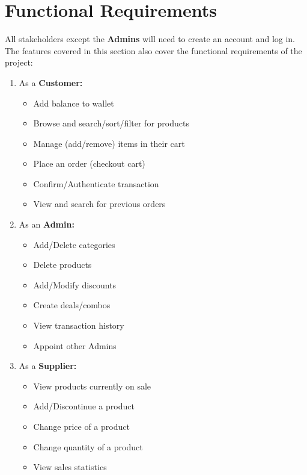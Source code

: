 \documentclass[12pt]{report}
\begin{document}
    \section*{\Huge Functional Requirements}
    \vspace*{10pt}
    All stakeholders except the \textbf{Admins} will need to create an account and log in.
    The features covered in this section also cover the functional requirements of the project:
    \begin{enumerate}
        \item As a \textbf{Customer:}
        \begin{itemize}
            \item Add balance to wallet
            \item Browse and search/sort/filter for products
            \item Manage (add/remove) items in their cart
            \item Place an order (checkout cart)
            \item Confirm/Authenticate transaction
            \item View and search for previous orders
        \end{itemize}

        \item As an \textbf{Admin:}
        \begin{itemize}
            \item Add/Delete categories
            \item Delete products
            \item Add/Modify discounts
            \item Create deals/combos
            \item View transaction history
            \item Appoint other Admins
        \end{itemize}

        \item As a \textbf{Supplier:}
        \begin{itemize}
            \item View products currently on sale
            \item Add/Discontinue a product
            \item Change price of a product
            \item Change quantity of a product
            \item View sales statistics
        \end{itemize}


\end{enumerate}
\end{document}
